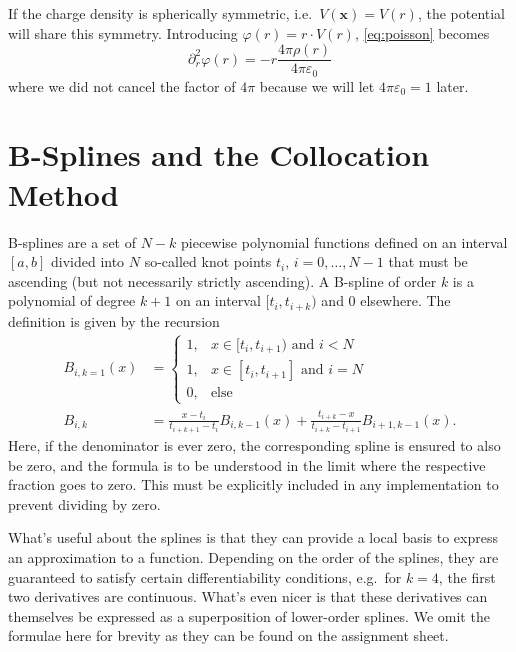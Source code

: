 \documentclass[a4paper,DIV=12,english]{scrartcl}
\begin{document}
If the charge density is spherically symmetric, i.e.\ $V(\textbf{x})=V(r)$, the potential will share this symmetry. Introducing $\varphi(r) = r\cdot V(r)$, \eqref{eq:poisson} becomes
\begin{equation}
    \partial_r^2 \varphi(r) = - r \frac{4\pi \rho(r)}{4\pi\varepsilon_0}
\end{equation}
where we did not cancel the factor of $4\pi$ because we will let $4\pi\varepsilon_0 = 1$ later.

\section{B-Splines and the Collocation Method}
B-splines are a set of $N-k$ piecewise polynomial functions defined on an interval $[a, b]$ divided into $N$ so-called knot points $t_i,\, i = 0,\dots,N-1$ that must be ascending (but not necessarily strictly ascending). A B-spline of order $k$ is a polynomial of degree $k+1$ on an interval $[t_i, t_{i+k})$ and 0 elsewhere. The definition is given by the recursion
\begin{align}
    B_{i,k=1}(x) &= \begin{cases}
        1, & x\in[t_i, t_{i+1}) \text{ and } i < N \\
        1, & x\in[t_i, t_{i+1}] \text{ and } i = N \\
        0, & \text{else}
    \end{cases}\\
    B_{i, k} &= \frac{x - t_i}{t_{i + k + 1} - t_i} B_{i, k-1}(x) + \frac{t_{i+k} - x}{t_{i + k} - t_{i+1}} B_{i+1, k-1}(x).
\end{align}
Here, if the denominator is ever zero, the corresponding spline is ensured to also be zero, and the formula is to be understood in the limit where the respective fraction goes to zero. This must be explicitly included in any implementation to prevent dividing by zero.

What's useful about the splines is that they can provide a local basis to express an approximation to a function. Depending on the order of the splines, they are guaranteed to satisfy certain differentiability conditions, e.g.\ for $k=4$, the first two derivatives are continuous. What's even nicer is that these derivatives can themselves be expressed as a superposition of lower-order splines. We omit the formulae here for brevity as they can be found on the assignment sheet.
\end{document}
